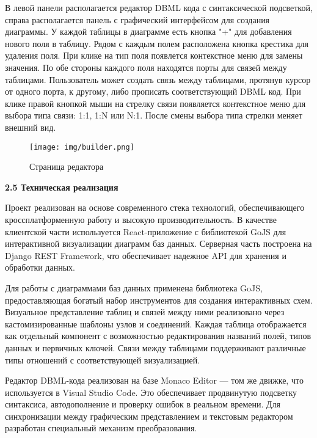 В левой панели располагается редактор DBML кода с синтаксической подсветкой, справа располагается панель с графический интерфейсом для создания диаграммы. У каждой таблицы в диаграмме есть кнопка "+" для добавления нового поля в таблицу. Рядом с каждым полем расположена кнопка крестика для удаления поля. При клике на тип поля появлется контекстное меню для замены значения. По обе стороны каждого поля находятся порты для связей между таблицами. Пользователь может создать связь между таблицами, протянув курсор от одного порта, к другому, либо прописать соответствующий DBML код. При клике правой кнопкой мыши на стрелку связи появляется контекстное меню для выбора типа связи: 1:1, 1:N или N:1. После смены выбора типа стрелки меняет внешний вид.
    
\renewcommand{\figurename}{Рисунок}
\begin{figure}[htbp]
    \centering %
    \texttt{[image: img/builder.png]}
    \caption{Страница редактора}
    \label{fig:analyze} %
\end{figure}

\textbf{2.5 Техническая реализация}

Проект реализован на основе современного стека технологий, обеспечивающего кроссплатформенную работу и высокую производительность. В качестве клиентской части используется React-приложение с библиотекой GoJS для интерактивной визуализации диаграмм баз данных. Серверная часть построена на Django REST Framework, что обеспечивает надежное API для хранения и обработки данных.

Для работы с диаграммами баз данных применена библиотека GoJS, предоставляющая богатый набор инструментов для создания интерактивных схем. Визуальное представление таблиц и связей между ними реализовано через кастомизированные шаблоны узлов и соединений. Каждая таблица отображается как отдельный компонент с возможностью редактирования названий полей, типов данных и первичных ключей. Связи между таблицами поддерживают различные типы отношений с соответствующей визуализацией.

Редактор DBML-кода реализован на базе Monaco Editor — том же движке, что используется в Visual Studio Code. Это обеспечивает продвинутую подсветку синтаксиса, автодополнение и проверку ошибок в реальном времени. Для синхронизации между графическим представлением и текстовым редактором разработан специальный механизм преобразования.

